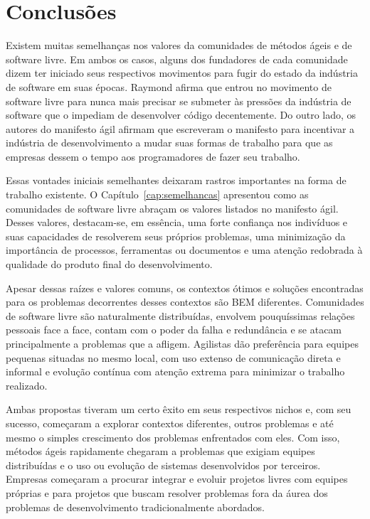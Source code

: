 \chapter{Conclusões}
\label{cap:conclusoes}

Existem muitas semelhanças nos valores da comunidades de métodos ágeis
e de software livre. Em ambos os casos, alguns dos fundadores de cada
comunidade dizem ter iniciado seus respectivos movimentos para fugir
do estado da indústria de software em suas épocas. Raymond afirma que
entrou no movimento de software livre para nunca mais precisar se
submeter às pressões da indústria de software que o impediam de
desenvolver código decentemente. Do outro lado, os autores do
manifesto ágil afirmam que escreveram o manifesto para incentivar a
indústria de desenvolvimento a mudar suas formas de trabalho para que
as empresas dessem o tempo aos programadores de fazer seu trabalho.

Essas vontades iniciais semelhantes deixaram rastros importantes na
forma de trabalho existente. O Capítulo~\ref{cap:semelhancas}
apresentou como as comunidades de software livre abraçam os valores
listados no manifesto ágil. Desses valores, destacam-se, em essência,
uma forte confiança nos indivíduos e suas capacidades de resolverem
seus próprios problemas, uma minimização da importância de processos,
ferramentas ou documentos e uma atenção redobrada à qualidade do
produto final do desenvolvimento.

Apesar dessas raízes e valores comuns, os contextos ótimos e soluções
encontradas para os problemas decorrentes desses contextos são BEM
diferentes. Comunidades de software livre são naturalmente
distribuídas, envolvem pouquíssimas relações pessoais face a face,
contam com o poder da falha e redundância e se atacam principalmente a
problemas que a afligem. Agilistas dão preferência para equipes
pequenas situadas no mesmo local, com uso extenso de comunicação
direta e informal e evolução contínua com atenção extrema para
minimizar o trabalho realizado.

Ambas propostas tiveram um certo êxito em seus respectivos nichos e,
com seu sucesso, começaram a explorar contextos diferentes, outros
problemas e até mesmo o simples crescimento dos problemas enfrentados
com eles. Com isso, métodos ágeis rapidamente chegaram a problemas que
exigiam equipes distribuídas e o uso ou evolução de sistemas
desenvolvidos por terceiros. Empresas começaram a procurar integrar e
evoluir projetos livres com equipes próprias e para projetos que
buscam resolver problemas fora da áurea dos problemas de
desenvolvimento tradicionalmente abordados.

